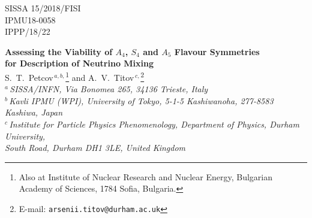 \documentclass[11pt,a4paper]{article}
\numberwithin{equation}{section}
\begin{document}


\begin{titlepage}

\vspace*{-15mm}
\begin{flushright}
SISSA 15/2018/FISI \\ 
IPMU18-0058 \\
IPPP/18/22
\end{flushright}
\vspace*{8mm}

\begin{center}
{\bf\Large Assessing the Viability of $A_4$, $S_4$ and $A_5$ Flavour Symmetries}\\[2mm]
{\bf\Large for Description of Neutrino Mixing}\\[8mm]
S.~T.~Petcov$^{\,a,b,}$\footnote{Also at Institute of Nuclear Research and Nuclear Energy, Bulgarian Academy of Sciences, 1784 Sofia, Bulgaria.} 
and
A.~V.~Titov$^{\,c,}$\footnote{E-mail: \texttt{arsenii.titov@durham.ac.uk}} \\
\vspace{8mm}
$^{a}$\,{\it SISSA/INFN, Via Bonomea 265, 34136 Trieste, Italy} \\
\vspace{2mm}
$^{b}$\,{\it Kavli IPMU (WPI), University of Tokyo, 
5-1-5 Kashiwanoha, 277-8583 Kashiwa, Japan} \\
\vspace{2mm}
$^{c}$\,{\it Institute for Particle Physics Phenomenology, 
Department of Physics, Durham University,\\ 
South Road, Durham DH1 3LE, United Kingdom}
\end{center}
\vspace{8mm}

\begin{abstract}
\noindent 
We consider the $A_4$, $S_4$ and $A_5$ 
discrete lepton flavour symmetries
in the case of 3-neutrino mixing,
broken down to non-trivial residual symmetries in 
the charged lepton and neutrino sectors in such a way that 
at least one of them is a $Z_2$. 
Such symmetry breaking patterns lead to predictions 
for some of the three neutrino mixing angles and/or 
the leptonic Dirac CP violation phase $\delta$
of the neutrino mixing matrix. 
We assess the viability of these predictions by 
performing a statistical analysis 
which uses as an input the latest 
global data on the neutrino mixing parameters. 
We find 14 phenomenologically viable cases 
providing distinct predictions for some of the mixing angles 
and/or the Dirac phase $\delta$. 
Employing the current best fit values of the 
three neutrino mixing angles, 
we perform a statistical analysis of these cases 
taking into account the prospective uncertainties 
in the determination of the mixing angles, 
planned to be achieved in currently running (Daya Bay) 
and the next generation (JUNO, T2HK, DUNE) of neutrino oscillation experiments.
We find that only six cases would be compatible with these prospective data. 
We show that this number is likely to be further reduced 
by a precision measurement of $\delta$.
\end{abstract}
\end{titlepage}
\setcounter{footnote}{0}
\end{document}
